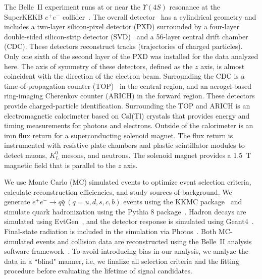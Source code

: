 \documentclass[aps,prl,twocolumn,superscriptaddress,showpacs,preprintnumbers,amsmath,amssymb]{revtex4-2}
\def\ra{\!\rightarrow\!}
\begin{document}
The Belle~II experiment runs at or near the $\Upsilon(4S)$ resonance 
at the SuperKEKB $e^{+} e^{-}$ collider~\cite{Akai:2018mbz}. The overall 
detector~\cite{Abe:2010gxa} has a cylindrical geometry and includes a two-layer 
silicon-pixel detector (PXD) surrounded by a four-layer double-sided 
silicon-strip detector (SVD)~\cite{Belle-IISVD:2022upf} and a 56-layer 
central drift chamber (CDC). 
These detectors reconstruct tracks (trajectories of charged particles).
Only one sixth of the second layer of the PXD was installed for the data analyzed here.
The axis of symmetry of these detectors, defined as the $z$ axis,
is almost coincident with the direction of the electron beam.
Surrounding the CDC is a time-of-propagation counter (TOP)~\cite{Wang:2017ajq} 
in the central region, and an aerogel-based ring-imaging Cherenkov 
counter (ARICH) in the forward region.
These detectors provide charged-particle identification.
Surrounding the TOP and ARICH is an electromagnetic calorimeter based on 
CsI(Tl) crystals that provides energy and timing measurements for photons 
and electrons. Outside of the calorimeter is an iron flux return for a 
superconducting solenoid magnet. The flux return is instrumented with 
resistive plate chambers and plastic scintillator modules to detect 
muons, $K^0_L$ mesons, and neutrons. The solenoid magnet provides 
a 1.5~T magnetic field that is parallel to the $z$ axis. 

We use Monte Carlo (MC) simulated events to optimize event selection criteria, 
calculate reconstruction efficiencies, and study sources of background. We generate 
$e^+e^-\ra q\bar{q}~(q=u,d,s,c,b)$ events using the {\sc KKMC} package~\cite{Jadach:1999vf} 
and simulate quark hadronization
using the {\sc Pythia 8} package~\cite{Sjostrand:2014zea}. 
Hadron decays are simulated using {\sc EvtGen}~\cite{Lange:2001uf}, and
the detector response is simulated using {\sc Geant4}~\cite{Agostinelli:2002hh}. 
Final-state radiation is included in the simulation via 
{\sc Photos}~\cite{Barberio:1993qi}. Both MC-simulated events and 
collision data are reconstructed using the Belle~II analysis software 
framework~\cite{Kuhr:2018lps,basf2-zenodo}. To avoid introducing bias 
in our analysis, we analyze the data in a ``blind" manner, i.e, we 
finalize all selection criteria and the fitting procedure before 
evaluating the lifetime of signal candidates.
\end{document}
